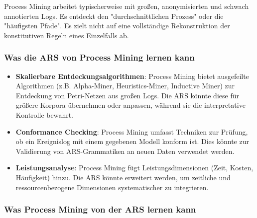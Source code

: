 \documentclass[12pt,a4paper]{article}
\begin{document}
Process Mining arbeitet typischerweise mit großen, anonymisierten und schwach 
annotierten Logs. Es entdeckt den "durchschnittlichen Prozess" oder die 
"häufigsten Pfade". Es zielt nicht auf eine vollständige Rekonstruktion der 
konstitutiven Regeln eines Einzelfalls ab.

\subsubsection{Was die ARS von Process Mining lernen kann}

\begin{itemize}
    \item \textbf{Skalierbare Entdeckungsalgorithmen}: Process Mining bietet 
    ausgefeilte Algorithmen (z.B. Alpha-Miner, Heuristics-Miner, Inductive 
    Miner) zur Entdeckung von Petri-Netzen aus großen Logs. Die ARS könnte 
    diese für größere Korpora übernehmen oder anpassen, während sie die 
    interpretative Kontrolle bewahrt.
    
    \item \textbf{Conformance Checking}: Process Mining umfasst Techniken 
    zur Prüfung, ob ein Ereignislog mit einem gegebenen Modell konform ist. 
    Dies könnte zur Validierung von ARS-Grammatiken an neuen Daten verwendet 
    werden.
    
    \item \textbf{Leistungsanalyse}: Process Mining fügt Leistungsdimensionen 
    (Zeit, Kosten, Häufigkeit) hinzu. Die ARS könnte erweitert werden, um 
    zeitliche und ressourcenbezogene Dimensionen systematischer zu integrieren.
\end{itemize}

\subsubsection{Was Process Mining von der ARS lernen kann}
\end{document}
